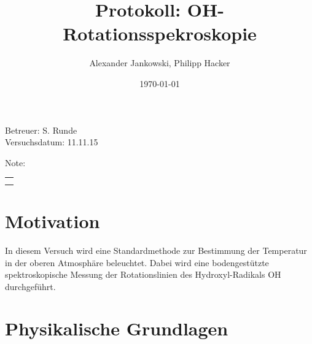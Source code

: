 \documentclass[numbers=noenddot,a4paper,notitlepage,twoside,BCOR15mm]{scrartcl}
\title{Protokoll: OH-Rotationsspekroskopie} %
\author{Alexander Jankowski, Philipp Hacker}
\date{\today}
\begin{document}
	\maketitle
	\begin{center}
		Betreuer: S. Runde  \\ %
		Versuchsdatum: 11.11.15 \\ %
		\begin{table}[h]
			\centering
			Note: %
			\begin{tabularx}{1.5cm}{|X|}
				\hline \\ \\
				\hline
			\end{tabularx}
		\end{table}
	\end{center}
	\vspace*{\fill}
	\tableofcontents
	\vfill
	\newpage
	\section{Motivation}
	
	In diesem Versuch wird eine Standardmethode zur Bestimmung der Temperatur in der oberen Atmosphäre beleuchtet. Dabei wird eine bodengestützte spektroskopische Messung der Rotationslinien des Hydroxyl-Radikals OH durchgeführt.
	
	\newpage
	\section{Physikalische Grundlagen}
	
\end{document}
